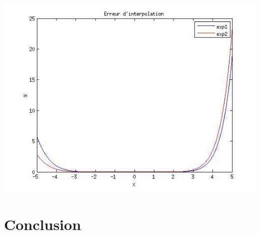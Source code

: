 \documentclass[a4paper,10pt]{report}
\begin{document}
\begin{center}
	\includegraphics[scale=0.8]{erreur.jpg} 
\end{center}


\chapter*{Conclusion}
\end{document}
